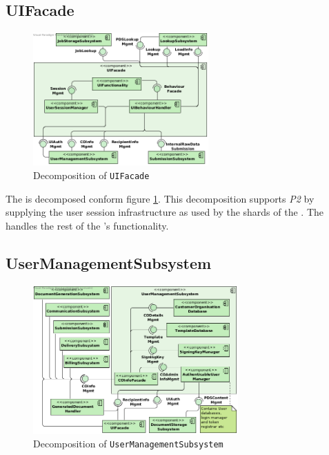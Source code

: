 \subsection{UIFacade}
\begin{figure}[!htp]
    \centering
    \includegraphics[width=0.6\textwidth]{figures/UI Facade.png}
    \caption{Decomposition of \texttt{UIFacade}}\label{fig:decomp-uif}
\end{figure}

The  is decomposed conform figure \ref{fig:decomp-uif}. This decomposition supports \emph{P2} by supplying the user session infrastructure as used by the shards of the . The  handles the rest of the 's functionality.

\subsection{UserManagementSubsystem}\label{sec:decomp-usersub}
\begin{figure}[!htp]
    \centering
    \includegraphics[width=0.7\textwidth]{figures/User Managment Subsystem.png}
    \caption{Decomposition of \texttt{UserManagementSubsystem}}\label{fig:decomp-usersub}
\end{figure}

